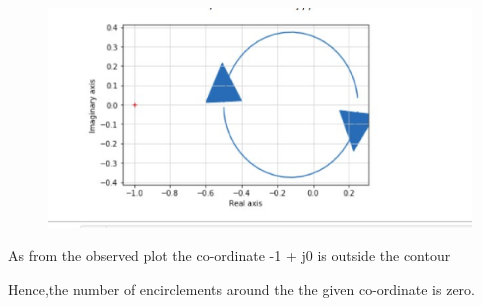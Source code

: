 \begin{enumerate}[label=\thesection.\arabic*.,ref=\thesection.\theenumi]
\begin{figure}[!h]
  \includegraphics[width=\columnwidth]{./figs/pythonnyquistplot.eps}
 
\end{figure}




As from the observed plot the co-ordinate -1 + j0 is outside the contour

\bigskip

Hence,the number of encirclements around the the given co-ordinate is zero.



\end{enumerate}
